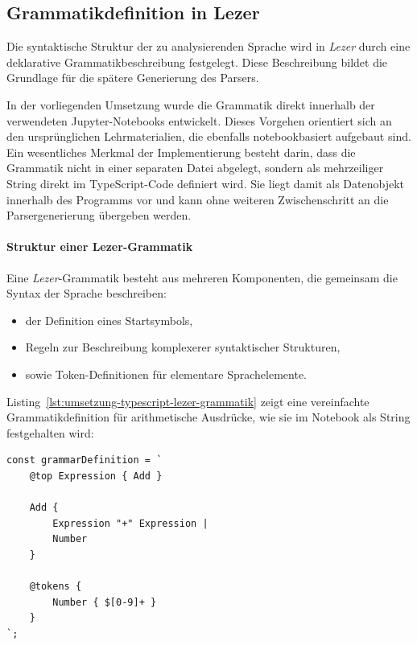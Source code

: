 \subsection{Grammatikdefinition in Lezer}
\label{subsec:lezer_grammar}

Die syntaktische Struktur der zu analysierenden Sprache wird in \emph{Lezer} durch eine deklarative Grammatikbeschreibung festgelegt. Diese Beschreibung bildet die Grundlage für die spätere Generierung des Parsers.

In der vorliegenden Umsetzung wurde die Grammatik direkt innerhalb der verwendeten Jupyter-Notebooks entwickelt. Dieses Vorgehen orientiert sich an den ursprünglichen Lehrmaterialien, die ebenfalls notebookbasiert aufgebaut sind. Ein wesentliches Merkmal der Implementierung besteht darin, dass die Grammatik nicht in einer separaten Datei abgelegt, sondern als mehrzeiliger String direkt im TypeScript-Code definiert wird. Sie liegt damit als Datenobjekt innerhalb des Programms vor und kann ohne weiteren Zwischenschritt an die Parsergenerierung übergeben werden.

\paragraph{Struktur einer Lezer-Grammatik}

Eine \emph{Lezer}-Grammatik besteht aus mehreren Komponenten, die gemeinsam die Syntax der Sprache beschreiben:

\begin{itemize}
    \item der Definition eines Startsymbols,
    \item Regeln zur Beschreibung komplexerer syntaktischer Strukturen,
    \item sowie Token-Definitionen für elementare Sprachelemente.
\end{itemize}

Listing~\ref{lst:umsetzung-typescript-lezer-grammatik} zeigt eine vereinfachte Grammatikdefinition für arithmetische Ausdrücke, wie sie im Notebook als String festgehalten wird:

\begin{listing}[htbp]
    \caption{Umsetzung Lezer-Grammatik in TypeScript}
    \label{lst:umsetzung-typescript-lezer-grammatik}
\begin{verbatim}
const grammarDefinition = `
    @top Expression { Add }

    Add {
        Expression "+" Expression |
        Number
    }

    @tokens {
        Number { $[0-9]+ }
    }
`;
\end{verbatim}
\end{listing}

